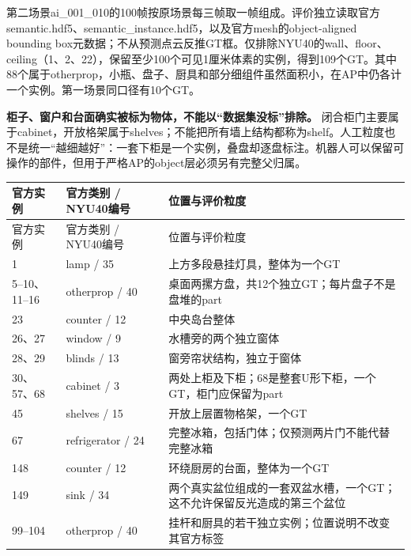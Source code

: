 \documentclass[UTF8,fontset=fandol]{ctexart}
\begin{document}
第二场景ai\_001\_010的100帧按原场景每三帧取一帧组成。评价独立读取官方semantic.hdf5、semantic\_instance.hdf5，以及官方mesh的object-aligned bounding box元数据；不从预测点云反推GT框。仅排除NYU40的wall、floor、ceiling（1、2、22），保留至少100个可见1厘米体素的实例，得到109个GT。其中88个属于otherprop，小瓶、盘子、厨具和部分细组件虽然面积小，在AP中仍各计一个实例。第一场景同口径有10个GT。



\textbf{柜子、窗户和台面确实被标为物体，不能以“数据集没标”排除。} 闭合柜门主要属于cabinet，开放格架属于shelves；不能把所有墙上结构都称为shelf。人工粒度也不是统一“越细越好”：一套下柜是一个实例，叠盘却逐盘标注。机器人可以保留可操作的部件，但用于严格AP的object层必须另有完整父归属。



{\small
\begin{longtable}{|p{}|p{}|p{}|}
\hline
官方实例 & 官方类别 / NYU40编号 & 位置与评价粒度 \\ \hline
\endfirsthead
\hline
官方实例 & 官方类别 / NYU40编号 & 位置与评价粒度 \\ \hline
\endhead
1 & lamp / 35 & 上方多段悬挂灯具，整体为一个GT \\ \hline
5–10、11–16 & otherprop / 40 & 桌面两摞方盘，共12个独立GT；每片盘子不是盘堆的part \\ \hline
23 & counter / 12 & 中央岛台整体 \\ \hline
26、27 & window / 9 & 水槽旁的两个独立窗体 \\ \hline
28、29 & blinds / 13 & 窗旁帘状结构，独立于窗体 \\ \hline
30、57、68 & cabinet / 3 & 两处上柜及下柜；68是整套U形下柜，一个GT，柜门应保留为part \\ \hline
45 & shelves / 15 & 开放上层置物格架，一个GT \\ \hline
67 & refrigerator / 24 & 完整冰箱，包括门体；仅预测两片门不能代替完整冰箱 \\ \hline
148 & counter / 12 & 环绕厨房的台面，整体为一个GT \\ \hline
149 & sink / 34 & 两个真实盆位组成的一套双盆水槽，一个GT；这不允许保留反光造成的第三个盆位 \\ \hline
99–104 & otherprop / 40 & 挂杆和厨具的若干独立实例；位置说明不改变其官方标签 \\ \hline
\end{longtable}
}
\end{document}
